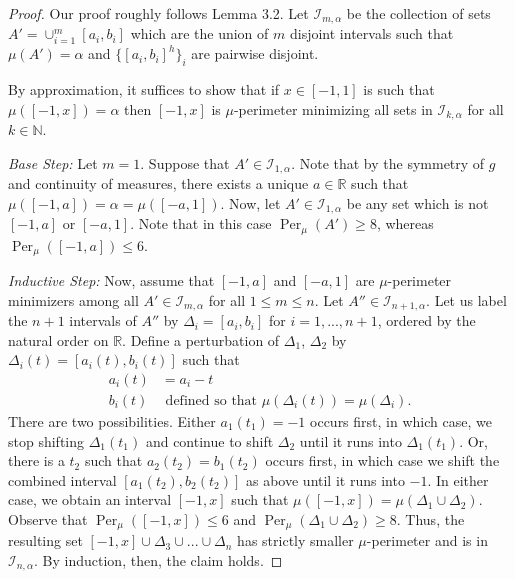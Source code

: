\documentclass[12pt]{amsart}
\numberwithin{equation}{section}
\theoremstyle{plain}
\theoremstyle{definition}
\begin{document}
\begin{proof}
Our proof roughly follows \cite{Bobkov96} Lemma 3.2.  Let $\mathscr{I}_{m, \alpha}$ be the collection of sets $A' = \cup_{i=1}^m [a_i, b_i]$ which are the union of $m$ disjoint intervals such that $\mu(A') = \alpha$ and $\{[a_i, b_i]^h\}_i$ are pairwise disjoint.

By approximation, it suffices to show that if $x \in [-1, 1]$ is such that $\mu([-1, x]) = \alpha$ then $[-1, x]$  is $\mu$-perimeter minimizing all sets in $\mathscr{I}_{k, \alpha}$ for all $k \in \mathbb{N}$.

\textit{Base Step:} Let $m=1$.  Suppose that $A' \in \mathscr{I}_{1, \alpha}$.  Note that by the symmetry of $g$ and continuity of measures, there exists a unique $a \in \mathbb{R}$ such that $\mu([-1, a]) = \alpha = \mu([-a, 1])$.   Now, let $A' \in \mathscr{I}_{1, \alpha}$ be any set which is not $[-1, a]$ or $[-a, 1]$. Note that in this case $\operatorname{Per}_{\mu}(A') \ge 8$, whereas $\operatorname{Per}_{\mu}([-1, a]) \le 6$. 

\textit{Inductive Step:} Now, assume that $[-1, a]$ and $[-a, 1]$ are $\mu$-perimeter minimizers among all $A' \in \mathscr{I}_{m, \alpha}$ for all $1 \le m \le n$. Let $A'' \in \mathscr{I}_{n+1, \alpha}$.  Let us label the $n+1$ intervals of $A''$ by $\Delta_i = [a_i, b_i]$ for $i=1, ..., n+1$, ordered by the natural order on $\mathbb{R}$. Define a perturbation of $\Delta_1$, $\Delta_2$ by $\Delta_i(t) = [a_i(t), b_i(t)]$ such that 
\begin{align*}
    a_i(t) & = a_i - t\\
    b_i(t) & \text{ defined so that } \mu(\Delta_i(t)) = \mu(\Delta_i).
\end{align*}
There are two possibilities.  Either $a_1(t_1)= -1$ occurs first, in which case, we stop shifting $\Delta_1(t_1)$ and continue to shift $\Delta_2$ until it runs into $\Delta_1(t_1)$.  Or,  there is a $t_2$ such that $a_2(t_2) = b_1(t_2)$ occurs first, in which case we shift the combined interval $[a_1(t_2), b_2(t_2)]$ as above until it runs into $-1$.  In either case, we obtain an interval $[-1, x]$ such that $\mu([-1, x]) = \mu(\Delta_1\cup \Delta_2)$.  Observe that $\operatorname{Per}_{\mu}([-1, x]) \le 6$ and $\operatorname{Per}_{\mu}(\Delta_1 \cup \Delta_2) \ge 8$. Thus, the resulting set $[-1, x] \cup \Delta_3 \cup ... \cup \Delta_n$ has strictly smaller $\mu$-perimeter and is in $\mathscr{I}_{n, \alpha}$. By induction, then, the claim holds.  
\end{proof}




\end{document}
